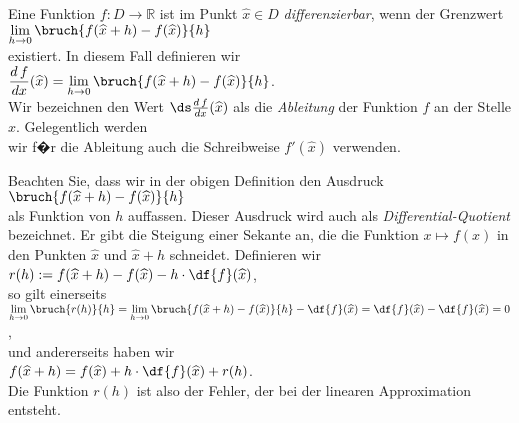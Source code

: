 \begin{Definition}[Ableitung]
Eine Funktion $f: D \rightarrow \mathbb{R}$ ist im Punkt $\widehat{x} \in D$ \emph{differenzierbar},
wenn der Grenzwert
\\[0.3cm]
\hspace*{1.3cm}
$\lim\limits_{h \rightarrow 0} \bruch{f(\widehat{x} + h) - f(\widehat{x})}{h}$
\\[0.3cm]
existiert.  In diesem Fall definieren wir 
\\[0.3cm]
\hspace*{1.3cm}
$\displaystyle\frac{d\,f}{dx}(\widehat{x}) = \lim\limits_{h \rightarrow 0}
\bruch{f(\widehat{x} + h) - f(\widehat{x})}{h}$.
\\[0.3cm]
Wir bezeichnen den Wert $\ds\frac{d\,f}{dx}(\widehat{x})$ als die \emph{Ableitung} der
Funktion $f$ an der Stelle $\widehat{x}$.  Gelegentlich werden \\[0.2cm]
wir f�r die Ableitung auch die Schreibweise 
$f'(\widehat{x})$ verwenden.
\eod
\end{Definition}


\remark
Beachten Sie, dass wir in der obigen Definition den Ausdruck
\\[0.3cm]
\hspace*{1.3cm} $\bruch{f(\widehat{x} + h) - f(\widehat{x})}{h}$ \\[0.3cm]
als Funktion von $h$ auffassen.  Dieser Ausdruck wird auch als \emph{Differential-Quotient}
bezeichnet.  Er gibt die Steigung einer Sekante an, die die Funktion $x \mapsto f(x)$
in den Punkten $\widehat{x}$ und $\widehat{x} + h$ schneidet.  Definieren wir 
\\[0.3cm]
\hspace*{1.3cm}
$r(h) := f(\widehat{x} + h) - f(\widehat{x}) - h \cdot \df{f}(\widehat{x})$,
\\[0.3cm]
so gilt einerseits 
\\[0.3cm]
\hspace*{1.3cm}
$\lim\limits_{h \rightarrow 0} \bruch{r(h)}{h} = 
 \lim\limits_{h \rightarrow 0} \bruch{f(\widehat{x} + h) -
  f(\widehat{x})}{h} - \df{f}(\widehat{x}) = \df{f}(\widehat{x}) - \df{f}(\widehat{x}) = 0$,
\\[0.3cm]
und andererseits haben wir 
\\[0.3cm]
\hspace*{1.3cm}
$f(\widehat{x} + h) = f(\widehat{x}) + h \cdot \df{f}(\widehat{x}) + r(h)$.
\\[0.3cm]
Die Funktion $r(h)$ ist also der Fehler, der bei der linearen Approximation
entsteht.  \eox


